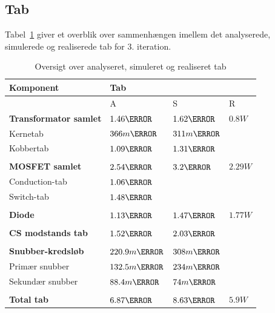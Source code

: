 \subsection{Tab}
Tabel~\ref{tab:realisering_tab_3} giver et overblik over sammenhængen imellem det analyserede, simulerede og realiserede tab for 3. iteration.
\begin{table}[H] 			
	\centering
	\begin{tabularx}{\textwidth}{|X|l|l|l|}
		\hline
		\textbf{\large Komponent} & \multicolumn{3}{|l|}{\textbf{\large Tab}} \\ \hline
		& A & S & R	\\ \hline
		\textbf{Transformator samlet} & $1.46\watt$ & $1.62\watt$ & $0.8W$ \\ \hline 
		Kernetab & $366m\watt$ & $311m\watt$ & \\ \hline
		Kobbertab & $1.09\watt$ & $1.31\watt$ & \\ \hline
		& &	& \\ \hline
		\textbf{MOSFET samlet} & $2.54\watt$ & $3.2\watt$ & $2.29W$ \\ \hline
		Conduction-tab & $1.06\watt$ &  &	\\ \hline
		Switch-tab & $1.48\watt$ & 	&		\\ \hline
		& &	& \\ \hline
		\textbf{Diode} & $1.13\watt$ & $1.47\watt$ & $1.77W$ \\ \hline
		& &	& \\ \hline
		\textbf{CS modstands tab} & $1.52\watt$ & $2.03\watt$ & \\ \hline
		& & &	\\ \hline
		\textbf{Snubber-kredsløb} & $220.9m\watt$ & $308m\watt$ & \\ \hline
		Primær snubber	& $132.5m\watt$	& $234m\watt$	&	\\ \hline
		Sekundær snubber &	$88.4m\watt$ &	$74m\watt$	&	\\ \hline
		& &	& \\ \hline
		\textbf{Total tab} & $6.87\watt$ & $8.63\watt$ & $5.9W$	\\ \hline
	\end{tabularx}
	\caption{Oversigt over analyseret, simuleret og realiseret tab}
	\label{tab:realisering_tab_3}
\end{table}

